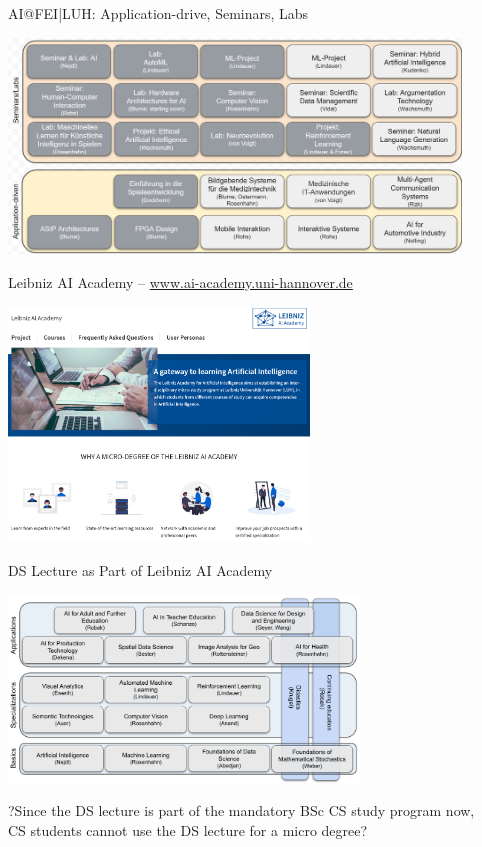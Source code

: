 \documentclass[aspectratio=169,handout]{../latex_main/tntbeamer}  %
\begin{document}
\begin{frame}[c]{AI@FEI|LUH: Application-drive, Seminars, Labs}

\vspace{-2em}
\centering
\includegraphics[width=0.9\textwidth]{figures/ai_apps_sems}

\end{frame}
\begin{frame}[c]{Leibniz AI Academy -- \url{www.ai-academy.uni-hannover.de}}

\centering
\includegraphics[width=0.6\textwidth]{figures/leibniz_ai_academy.png}

\end{frame}
\begin{frame}[c]{DS Lecture as Part of Leibniz AI Academy}

\centering
\includegraphics[width=0.7\textwidth]{figures/csm_Courses-New_f92e895af8.png}

?Since the DS lecture is part of the mandatory BSc CS study program now,\\ CS students cannot use the DS lecture for a micro degree?

\end{frame}
\end{document}
